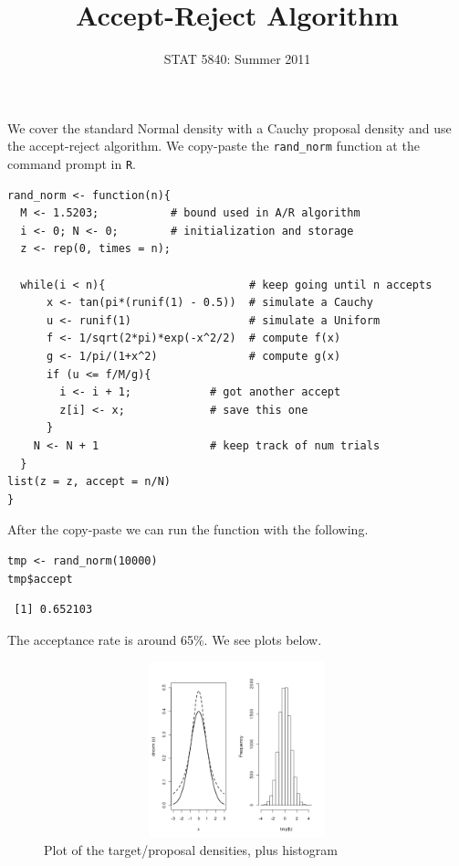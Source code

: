 \documentclass[11pt,english]{article}
\title{Accept-Reject Algorithm}
\date{STAT 5840: Summer 2011}
\begin{document}
\maketitle

\thispagestyle{empty}

We cover the standard Normal density with a Cauchy proposal density and use the accept-reject algorithm.  We copy-paste the \texttt{rand\_norm} function at the command prompt in \texttt{R}.


\begin{verbatim}
rand_norm <- function(n){
  M <- 1.5203;           # bound used in A/R algorithm
  i <- 0; N <- 0;        # initialization and storage
  z <- rep(0, times = n);

  while(i < n){                      # keep going until n accepts
      x <- tan(pi*(runif(1) - 0.5))  # simulate a Cauchy
      u <- runif(1)                  # simulate a Uniform
      f <- 1/sqrt(2*pi)*exp(-x^2/2)  # compute f(x)
      g <- 1/pi/(1+x^2)              # compute g(x)
      if (u <= f/M/g){
        i <- i + 1;            # got another accept
        z[i] <- x;             # save this one
      }
    N <- N + 1                 # keep track of num trials
  }
list(z = z, accept = n/N)                     
}
\end{verbatim}



After the copy-paste we can run the function with the following.

\begin{verbatim}
tmp <- rand_norm(10000)
tmp$accept
\end{verbatim}




\begin{verbatim}
 [1] 0.652103
\end{verbatim}


The acceptance rate is around 65\%.  We see plots below.



\begin{figure}[h!]
\centering
\includegraphics[width=5in, height=2in,]{ARalgo.png}
\caption{\label{fig:yplot}Plot of the target/proposal densities, plus histogram}
\end{figure}
\end{document}
